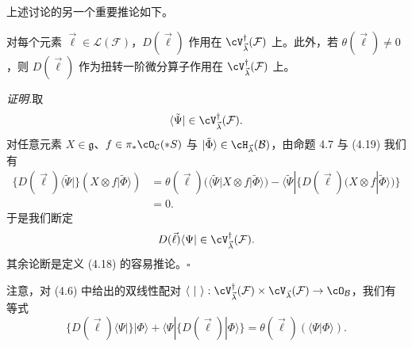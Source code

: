 上述讨论的另一个重要推论如下。

\begin{proposition}[4.12]
对每个元素 $\vec{\ell}\in\mathcal{L}(\mathcal{F})$，$D(\vec{\ell})$ 作用在
$\cV_{\vec{\lambda}}^\dagger(\mathcal{F})$ 上。此外，若
$\theta(\vec{\ell})\ne 0$，则 $D(\vec{\ell})$ 作为扭转一阶微分算子作用在
$\cV_{\vec{\lambda}}^\dagger(\mathcal{F})$ 上。
\end{proposition}

\noindent\textit{证明.}\quad 取
\[
  \langle\tilde{\Psi}|\in\cV_{\vec{\lambda}}^\dagger(\mathcal{F}) .
\]
对任意元素 $X\in\mathfrak{g}$、$f\in\pi_*\cO_\mathcal{C}(*S)$ 与
$|\tilde{\Phi}\rangle\in\cH_{\vec{\lambda}}(\mathcal{B})$，由命题 4.7 与
(4.19) 我们有
\[
  \begin{aligned}
  \{D(\vec{\ell})\langle\tilde{\Psi}|\}(X\otimes f|\tilde{\Phi}\rangle)
  &= \theta(\vec{\ell})
     \bigl(\langle\tilde{\Psi}|X\otimes f|\tilde{\Phi}\rangle\bigr)
     -\langle\tilde{\Psi}|
     \bigl\{D(\vec{\ell})\bigl(X\otimes f|\tilde{\Phi}\rangle\bigr)\bigr\}\\
  &= 0 .
  \end{aligned}
\]
于是我们断定
\[
  D(\vec{\ell})\langle\Psi|\in\cV_{\vec{\lambda}}^\dagger(\mathcal{F}) .
\]
其余论断是定义 (4.18) 的容易推论。\hfill$\square$

注意，对 (4.6) 中给出的双线性配对
$\langle\ |\ \rangle:\cV_{\vec{\lambda}}^\dagger(\mathcal{F})
\times\cV_{\vec{\lambda}}(\mathcal{F})\to\cO_\mathcal{B}$，我们有等式
\begin{equation}
  \{D(\vec{\ell})\langle\Psi|\}|\Phi\rangle
  +\langle\Psi|\{D(\vec{\ell})|\Phi\rangle\}
  = \theta(\vec{\ell})(\langle\Psi|\Phi\rangle) . \tag{4.23}
\end{equation}
